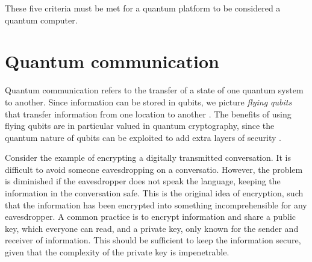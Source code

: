 \noindent These five criteria must be met for a quantum platform to be considered a quantum computer.




\section{Quantum communication}

Quantum communication refers to the transfer of a state of one quantum system to another. Since information can be stored in qubits, we picture \textit{flying qubits} that transfer information from one location to another \cite{Griffiths2002}. The benefits of using flying qubits are in particular valued in quantum cryptography, since the quantum nature of qubits can be exploited to add extra layers of security \cite{Pavicic2006}.



Consider the example of encrypting a digitally transmitted conversation. It is difficult to avoid someone eavesdropping on a conversatio. However, the problem is diminished if the eavesdropper does not speak the language, keeping the information in the conversation safe. This is the original idea of encryption, such that the information has been encrypted into something incomprehensible for any eavesdropper. A common practice is to encrypt information and share a public key, which everyone can read, and a private key, only known for the sender and receiver of information. This should be sufficient to keep the information secure, given that the complexity of the private key is impenetrable.

